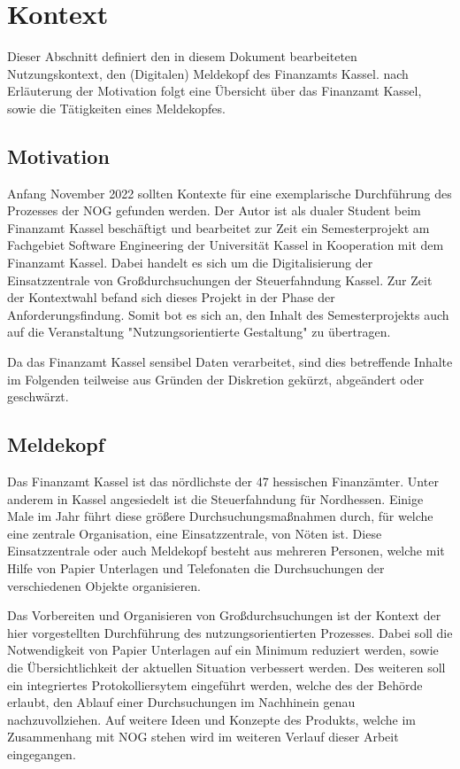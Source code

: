 \section{Kontext}

Dieser Abschnitt definiert den in diesem Dokument bearbeiteten Nutzungskontext, den (Digitalen) Meldekopf des Finanzamts Kassel.
nach Erläuterung der Motivation folgt eine Übersicht über das Finanzamt Kassel, sowie die Tätigkeiten eines Meldekopfes.

\subsection{Motivation}

Anfang November 2022 sollten Kontexte für eine exemplarische Durchführung des Prozesses der NOG gefunden werden.
Der Autor ist als dualer Student beim Finanzamt Kassel beschäftigt und bearbeitet zur Zeit ein Semesterprojekt am Fachgebiet Software Engineering der Universität Kassel in Kooperation mit dem Finanzamt Kassel. 
Dabei handelt es sich um die Digitalisierung der Einsatzzentrale von Großdurchsuchungen der Steuerfahndung Kassel.
Zur Zeit der Kontextwahl befand sich dieses Projekt in der Phase der Anforderungsfindung.
Somit bot es sich an, den Inhalt des Semesterprojekts auch auf die Veranstaltung "Nutzungsorientierte Gestaltung" zu übertragen.

Da das Finanzamt Kassel sensibel Daten verarbeitet, sind dies betreffende Inhalte im Folgenden teilweise aus Gründen der Diskretion gekürzt, abgeändert oder geschwärzt.

\subsection{Meldekopf}

Das Finanzamt Kassel ist das nördlichste der 47 hessischen Finanzämter.
Unter anderem in Kassel angesiedelt ist die Steuerfahndung für Nordhessen.
Einige Male im Jahr führt diese größere Durchsuchungsmaßnahmen durch, für welche eine zentrale Organisation, eine Einsatzzentrale, von Nöten ist.
Diese Einsatzzentrale oder auch Meldekopf besteht aus mehreren Personen, welche mit Hilfe von Papier Unterlagen und Telefonaten die Durchsuchungen der verschiedenen Objekte organisieren.

Das Vorbereiten und Organisieren von Großdurchsuchungen ist der Kontext der hier vorgestellten Durchführung des nutzungsorientierten Prozesses.
Dabei soll die Notwendigkeit von Papier Unterlagen auf ein Minimum reduziert werden, sowie die Übersichtlichkeit der aktuellen Situation verbessert werden.
Des weiteren soll ein integriertes Protokolliersytem eingeführt werden, welche des der Behörde erlaubt, den Ablauf einer Durchsuchungen im Nachhinein genau nachzuvollziehen. 
Auf weitere Ideen und Konzepte des Produkts, welche im Zusammenhang mit NOG stehen wird im weiteren Verlauf dieser Arbeit eingegangen.